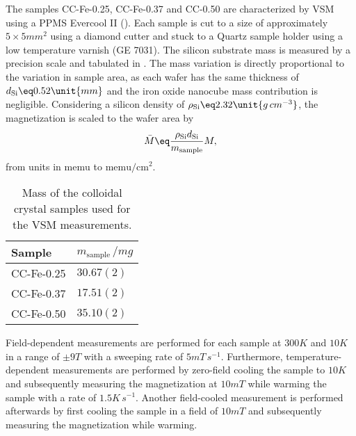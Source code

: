 \documentclass[\main/dresen_thesis.tex]{subfiles}
\begin{document}
    The samples CC-Fe-0.25, CC-Fe-0.37 and CC-0.50 are characterized by VSM using a PPMS Evercool II ().
    Each sample is cut to a size of approximately $5 \times 5 \unit{mm^2}$ using a diamond cutter and stuck to a Quartz sample holder using a low temperature varnish (GE 7031).
    The silicon substrate mass is measured by a precision scale and tabulated in .
    The mass variation is directly proportional to the variation in sample area, as each wafer has the same thickness of $d_\mathrm{Si} \eq 0.52 \unit{mm}$ and the iron oxide nanocube mass contribution is negligible.
    Considering a silicon density of $\rho_\mathrm{Si} \eq 2.32 \unit{g \, cm^{-3}}$, the magnetization is scaled to the wafer area by
    \begin{align}
      \bar{M} \eq \frac{\rho_\mathrm{Si} d_\mathrm{Si}}{m_\mathrm{sample}} M,
    \end{align}
    from units in $\mathrm{memu}$ to $\mathrm{memu / cm^2}$.

    \begin{table}[htbp]
      \centering
      \caption{\label{tab:colloidalCrystals:layerCharacterization:ppmsMasses}Mass of the colloidal crystal samples used for the VSM measurements.}
      \begin{tabular}{ l | l}
        \rule{0pt}{2ex} \textbf{Sample}  & $m_\mathrm{sample} \, / \unit{mg}$ \\
        \hline
        \rule{0pt}{2ex} CC-Fe-0.25   & $30.67(2)$ \\
        \rule{0pt}{2ex} CC-Fe-0.37   & $17.51(2)$ \\
        \rule{0pt}{2ex} CC-Fe-0.50   & $35.10(2)$ \\
        \hline
      \end{tabular}
    \end{table}

    Field-dependent measurements are performed for each sample at $300 \unit{K}$ and $10 \unit{K}$ in a range of $\pm 9 \unit{T}$ with a sweeping rate of $5 \unit{mT \, s^{-1}}$.
    Furthermore, temperature-dependent measurements are performed by zero-field cooling the sample to $10 \unit{K}$ and subsequently measuring the magnetization at $10 \unit{mT}$ while warming the sample with a rate of $1.5 \unit{K \, s^{-1}}$.
    Another field-cooled measurement is performed afterwards by first cooling the sample in a field of $10 \unit{mT}$ and subsequently measuring the magnetization while warming.
\end{document}
